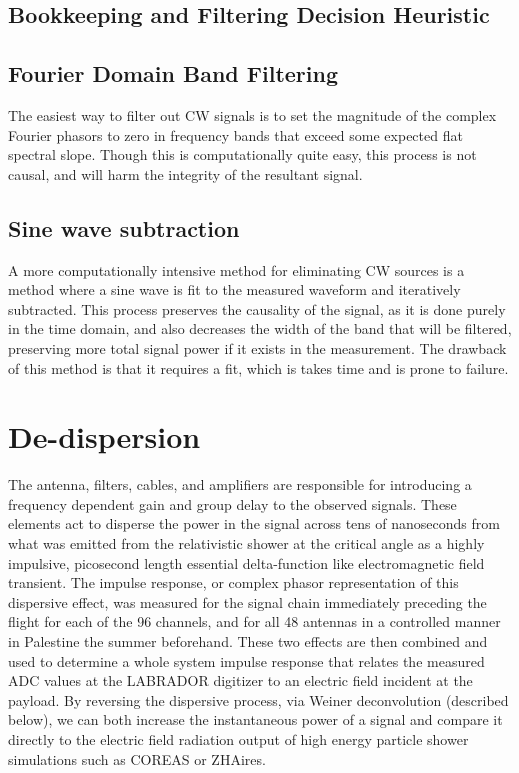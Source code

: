 	\subsection{Bookkeeping and Filtering Decision Heuristic}
	\subsection{Fourier Domain Band Filtering}
			The easiest way to filter out CW signals is to set the magnitude of the complex Fourier phasors to zero in frequency bands that exceed some expected flat spectral slope.  Though this is computationally quite easy, this process is not causal, and will harm the integrity of the resultant signal.
		\subsection{Sine wave subtraction}
			A more computationally intensive method for eliminating CW sources is a method where a sine wave is fit to the measured waveform and iteratively subtracted.  This process preserves the causality of the signal, as it is done purely in the time domain, and also decreases the width of the band that will be filtered, preserving more total signal power if it exists in the measurement.  The drawback of this method is that it requires a fit, which is takes time and is prone to failure.


\section{De-dispersion}
	The antenna, filters, cables, and amplifiers are responsible for introducing a frequency dependent gain and group delay to the observed signals.  These elements act to disperse the power in the signal across tens of nanoseconds from what was emitted from the relativistic shower at the critical angle as a highly impulsive, picosecond length essential delta-function like electromagnetic field transient.  The impulse response, or complex phasor representation of this dispersive effect, was measured for the signal chain immediately preceding the flight for each of the 96 channels, and for all 48 antennas in a controlled manner in Palestine the summer beforehand.  These two effects are then combined and used to determine a whole system impulse response that relates the measured ADC values at the LABRADOR digitizer to an electric field incident at the payload.  By reversing the dispersive process, via Weiner deconvolution (described below), we can both increase the instantaneous power of a signal and compare it directly to the electric field radiation output of high energy particle shower simulations such as COREAS or ZHAires.
